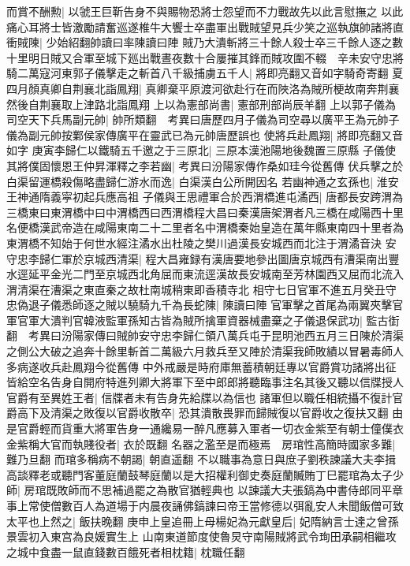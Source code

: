 而賞不酬勲|{
	以虢王巨靳告身不與賜物恐將士怨望而不力戰故先以此言慰撫之}
以此痛心耳將士皆激勵請奮巡遂椎牛大饗士卒盡軍出戰賊望見兵少笑之巡執旗帥諸將直衝賊陳|{
	少始紹翻帥讀曰率陳讀曰陣}
賊乃大潰斬將三十餘人殺士卒三千餘人逐之數十里明日賊又合軍至城下廵出戰晝夜數十合屢摧其鋒而賊攻圍不輟　辛未安守忠將騎二萬寇河東郭子儀擊走之斬首八千級捕虜五千人|{
	將即亮翻又音如字騎奇寄翻}
夏四月顏真卿自荆襄北詣鳳翔|{
	真卿棄平原渡河欲赴行在而陜洛為賊所梗故南奔荆襄然後自荆襄取上津路北詣鳳翔}
上以為憲部尚書|{
	憲部刑部尚辰羊翻}
上以郭子儀為司空天下兵馬副元帥|{
	帥所類翻　考異曰唐歷四月子儀為司空尋以廣平王為元帥子儀為副元帥按鄴侯家傳廣平在靈武已為元帥唐歷誤也}
使將兵赴鳳翔|{
	將即亮翻又音如字}
庚寅李歸仁以鐵騎五千邀之于三原北|{
	三原本漢池陽地後魏置三原縣}
子儀使其將僕固懷恩王仲昇渾釋之李若幽|{
	考異曰汾陽家傳作桑如珪今從舊傳}
伏兵擊之於白渠留運橋殺傷略盡歸仁游水而逸|{
	白渠漢白公所開因名}
若幽神通之玄孫也|{
	淮安王神通隋義寜初起兵應高祖}
子儀與王思禮軍合於西渭橋進屯潏西|{
	唐都長安跨渭為三橋東曰東渭橋中曰中渭橋西曰西渭橋程大昌曰秦漢唐架渭者凡三橋在咸陽西十里名便橋漢武帝造在咸陽東南二十二里者名中渭橋秦始皇造在萬年縣東南四十里者為東渭橋不知始于何世水經注潏水出杜陵之樊川過漢長安城西而北注于渭潏音決}
安守忠李歸仁軍於京城西清渠|{
	程大昌雍録有漢唐要地參出圖唐京城西有漕渠南出豐水逕延平金光二門至京城西北角屈而東流逕漢故長安城南至芳林園西又屈而北流入渭清渠在漕渠之東直秦之故杜南城稍東即香積寺北}
相守七日官軍不進五月癸丑守忠偽退子儀悉師逐之賊以驍騎九千為長蛇陳|{
	陳讀曰陣}
官軍擊之首尾為兩翼夾擊官軍官軍大潰判官韓液監軍孫知古皆為賊所擒軍資器械盡棄之子儀退保武功|{
	監古衘翻　考異曰汾陽家傳曰賊帥安守忠李歸仁領八萬兵屯于昆明池西五月三日陳於清渠之側公大破之追奔十餘里斬首二萬級六月救兵至又陣於清渠我師敗績以冒暑毒師人多病遂收兵赴鳳翔今從舊傳}
中外戒嚴是時府庫無蓄積朝廷專以官爵賞功諸將出征皆給空名告身自開府特進列卿大將軍下至中郎郎將聽臨事注名其後又聽以信牒授人官爵有至異姓王者|{
	信牒者未有告身先給牒以為信也}
諸軍但以職任相統攝不復計官爵高下及清渠之敗復以官爵收散卒|{
	恐其潰散畏罪而歸賊復以官爵收之復扶又翻}
由是官爵輕而貨重大將軍告身一通纔易一醉凡應募入軍者一切衣金紫至有朝士僮僕衣金紫稱大官而執賤役者|{
	衣於既翻}
名器之濫至是而極焉　房琯性高簡時國家多難|{
	難乃旦翻}
而琯多稱病不朝謁|{
	朝直遥翻}
不以職事為意日與庶子劉秩諫議大夫李揖高談釋老或聽門客董庭蘭鼓琴庭蘭以是大招權利御史奏庭蘭贓賄丁巳罷琯為太子少師|{
	房琯既敗師而不思補過罷之為散官猶輕典也}
以諫議大夫張鎬為中書侍郎同平章事上常使僧數百人為道場于内晨夜誦佛鎬諫曰帝王當修德以弭亂安人未聞飯僧可致太平也上然之|{
	飯扶晚翻}
庚申上皇追冊上母楊妃為元獻皇后|{
	妃隋納言士達之曾孫景雲初入東宫為良媛實生上}
山南東道節度使魯炅守南陽賊將武令珣田承嗣相繼攻之城中食盡一鼠直錢數百餓死者相枕籍|{
	枕職任翻}
